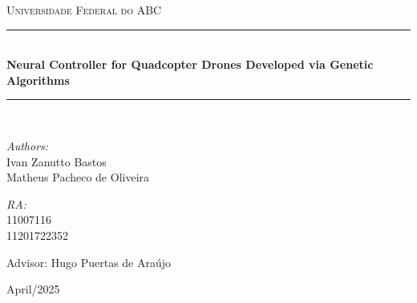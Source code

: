 \documentclass[12pt]{article}
\newcommand{\HRule}{\rule{\linewidth}{0.5mm}}
\theoremstyle{definition}
\begin{document}
\thispagestyle{empty}
\begin{center}
    \textsc{Universidade Federal do ABC}\\[1em]
    
    \vfill

    \HRule \\[0.2cm]
    {\Large\bfseries Neural Controller for Quadcopter Drones Developed via Genetic Algorithms}\\
    
    \HRule \\[1.5cm]
    \vfill
    
    \begin{minipage}{0.4\textwidth}
    \begin{flushleft}
    \emph{Authors:}\\
    Ivan Zanutto Bastos \\
    Matheus Pacheco de Oliveira\\
    \end{flushleft}
    \end{minipage}
    \begin{minipage}{0.5\textwidth}
    \begin{flushright}
    \emph{RA:}\\
    11007116 \\
    11201722352 \\
    \end{flushright}
    \end{minipage}

    \vfill
    Advisor: Hugo Puertas de Araújo

    April/2025
\end{center}
\newpage

\begin{abstract}
The rapid technological advancements have driven the adoption of autonomous drones across various fields, notably in precision agriculture, logistics, and disaster management, where these devices provide increased efficiency and scalability compared to human-operated systems. In this context, artificial neural networks emerge as a promising solution due to their ability to adapt to dynamic and nonlinear environments. Simultaneously, genetic algorithms (GAs) have proven effective in optimizing neural networks by efficiently exploring solution spaces to adjust weights and parameters.

This study proposes the development of a neural controller for quadcopter drones using GAs, focusing on autonomous navigation in simulated environments. The controller is trained to navigate the drone to designated locations, assuming continuous flight without addressing takeoff or landing. To achieve this, a virtual environment was modeled using the Gymnasium platform, a neural network was implemented for drone control, and genetic algorithms were applied to optimize the controller.
\end{abstract}
\newpage
\end{document}
